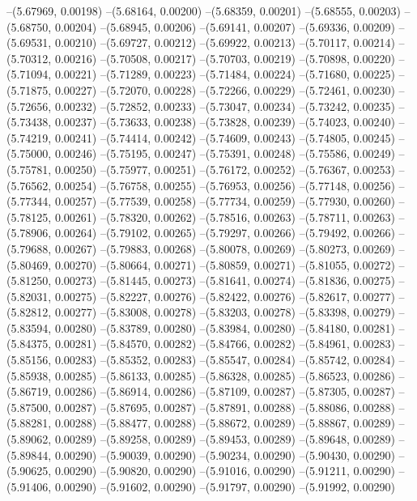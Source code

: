 --(5.67969, 0.00198)
--(5.68164, 0.00200)
--(5.68359, 0.00201)
--(5.68555, 0.00203)
--(5.68750, 0.00204)
--(5.68945, 0.00206)
--(5.69141, 0.00207)
--(5.69336, 0.00209)
--(5.69531, 0.00210)
--(5.69727, 0.00212)
--(5.69922, 0.00213)
--(5.70117, 0.00214)
--(5.70312, 0.00216)
--(5.70508, 0.00217)
--(5.70703, 0.00219)
--(5.70898, 0.00220)
--(5.71094, 0.00221)
--(5.71289, 0.00223)
--(5.71484, 0.00224)
--(5.71680, 0.00225)
--(5.71875, 0.00227)
--(5.72070, 0.00228)
--(5.72266, 0.00229)
--(5.72461, 0.00230)
--(5.72656, 0.00232)
--(5.72852, 0.00233)
--(5.73047, 0.00234)
--(5.73242, 0.00235)
--(5.73438, 0.00237)
--(5.73633, 0.00238)
--(5.73828, 0.00239)
--(5.74023, 0.00240)
--(5.74219, 0.00241)
--(5.74414, 0.00242)
--(5.74609, 0.00243)
--(5.74805, 0.00245)
--(5.75000, 0.00246)
--(5.75195, 0.00247)
--(5.75391, 0.00248)
--(5.75586, 0.00249)
--(5.75781, 0.00250)
--(5.75977, 0.00251)
--(5.76172, 0.00252)
--(5.76367, 0.00253)
--(5.76562, 0.00254)
--(5.76758, 0.00255)
--(5.76953, 0.00256)
--(5.77148, 0.00256)
--(5.77344, 0.00257)
--(5.77539, 0.00258)
--(5.77734, 0.00259)
--(5.77930, 0.00260)
--(5.78125, 0.00261)
--(5.78320, 0.00262)
--(5.78516, 0.00263)
--(5.78711, 0.00263)
--(5.78906, 0.00264)
--(5.79102, 0.00265)
--(5.79297, 0.00266)
--(5.79492, 0.00266)
--(5.79688, 0.00267)
--(5.79883, 0.00268)
--(5.80078, 0.00269)
--(5.80273, 0.00269)
--(5.80469, 0.00270)
--(5.80664, 0.00271)
--(5.80859, 0.00271)
--(5.81055, 0.00272)
--(5.81250, 0.00273)
--(5.81445, 0.00273)
--(5.81641, 0.00274)
--(5.81836, 0.00275)
--(5.82031, 0.00275)
--(5.82227, 0.00276)
--(5.82422, 0.00276)
--(5.82617, 0.00277)
--(5.82812, 0.00277)
--(5.83008, 0.00278)
--(5.83203, 0.00278)
--(5.83398, 0.00279)
--(5.83594, 0.00280)
--(5.83789, 0.00280)
--(5.83984, 0.00280)
--(5.84180, 0.00281)
--(5.84375, 0.00281)
--(5.84570, 0.00282)
--(5.84766, 0.00282)
--(5.84961, 0.00283)
--(5.85156, 0.00283)
--(5.85352, 0.00283)
--(5.85547, 0.00284)
--(5.85742, 0.00284)
--(5.85938, 0.00285)
--(5.86133, 0.00285)
--(5.86328, 0.00285)
--(5.86523, 0.00286)
--(5.86719, 0.00286)
--(5.86914, 0.00286)
--(5.87109, 0.00287)
--(5.87305, 0.00287)
--(5.87500, 0.00287)
--(5.87695, 0.00287)
--(5.87891, 0.00288)
--(5.88086, 0.00288)
--(5.88281, 0.00288)
--(5.88477, 0.00288)
--(5.88672, 0.00289)
--(5.88867, 0.00289)
--(5.89062, 0.00289)
--(5.89258, 0.00289)
--(5.89453, 0.00289)
--(5.89648, 0.00289)
--(5.89844, 0.00290)
--(5.90039, 0.00290)
--(5.90234, 0.00290)
--(5.90430, 0.00290)
--(5.90625, 0.00290)
--(5.90820, 0.00290)
--(5.91016, 0.00290)
--(5.91211, 0.00290)
--(5.91406, 0.00290)
--(5.91602, 0.00290)
--(5.91797, 0.00290)
--(5.91992, 0.00290)
